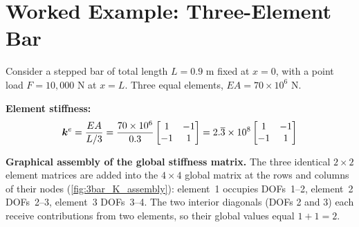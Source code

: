 \section{Worked Example: Three-Element Bar}

\begin{example}
\label{ex:3bar}

Consider a stepped bar of total length $L = 0.9$ m fixed at $x=0$,
with a point load $F = 10{,}000$ N at $x = L$. Three equal elements,
$EA = 70 \times 10^6$ N.

\medskip
\noindent\textbf{Element stiffness:}
\[
    \bm{k}^e = \frac{EA}{L/3} = \frac{70\times10^6}{0.3}
    \begin{bmatrix}1&-1\\-1&1\end{bmatrix}
    = 2.\overline{3}\times10^8
    \begin{bmatrix}1&-1\\-1&1\end{bmatrix}
\]

\medskip
\noindent\textbf{Graphical assembly of the global stiffness matrix.}
The three identical $2{\times}2$ element matrices are added into the
$4{\times}4$ global matrix at the rows and columns of their nodes
(\cref{fig:3bar_K_assembly}): element~1 occupies DOFs~1--2, element~2
DOFs~2--3, element~3 DOFs~3--4. The two interior diagonals (DOFs 2 and 3)
each receive contributions from two elements, so their global values
equal $1+1 = 2$.

\begin{figure}[htbp]
\centering
{}
\end{figure}
\end{example}
